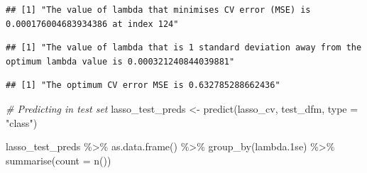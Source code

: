 \documentclass[
]{article}
\newenvironment{Shaded}{\begin{snugshade}}{\end{snugshade}}
\newcommand{\AttributeTok}[1]{\textcolor[rgb]{0.77,0.63,0.00}{#1}}
\newcommand{\CommentTok}[1]{\textcolor[rgb]{0.56,0.35,0.01}{\textit{#1}}}
\newcommand{\DecValTok}[1]{\textcolor[rgb]{0.00,0.00,0.81}{#1}}
\newcommand{\FloatTok}[1]{\textcolor[rgb]{0.00,0.00,0.81}{#1}}
\newcommand{\FunctionTok}[1]{\textcolor[rgb]{0.00,0.00,0.00}{#1}}
\newcommand{\NormalTok}[1]{#1}
\newcommand{\OtherTok}[1]{\textcolor[rgb]{0.56,0.35,0.01}{#1}}
\newcommand{\SpecialCharTok}[1]{\textcolor[rgb]{0.00,0.00,0.00}{#1}}
\newcommand{\StringTok}[1]{\textcolor[rgb]{0.31,0.60,0.02}{#1}}
\begin{document}
\begin{verbatim}
## [1] "The value of lambda that minimises CV error (MSE) is 0.000176004683934386 at index 124"
\end{verbatim}

\begin{Shaded}
\end{Shaded}

\begin{verbatim}
## [1] "The value of lambda that is 1 standard deviation away from the optimum lambda value is 0.000321240844039881"
\end{verbatim}

\begin{Shaded}
\end{Shaded}

\begin{verbatim}
## [1] "The optimum CV error MSE is 0.632785288662436"
\end{verbatim}

\begin{Shaded}
\begin{Highlighting}[]
\CommentTok{\# Predicting in test set}
\NormalTok{lasso\_test\_preds }\OtherTok{\textless{}{-}} \FunctionTok{predict}\NormalTok{(lasso\_cv, test\_dfm, }\AttributeTok{type =} \StringTok{"class"}\NormalTok{)}

\NormalTok{lasso\_test\_preds }\SpecialCharTok{\%\textgreater{}\%}
  \FunctionTok{as.data.frame}\NormalTok{() }\SpecialCharTok{\%\textgreater{}\%}
  \FunctionTok{group\_by}\NormalTok{(lambda}\FloatTok{.1}\NormalTok{se) }\SpecialCharTok{\%\textgreater{}\%}
  \FunctionTok{summarise}\NormalTok{(}\AttributeTok{count =} \FunctionTok{n}\NormalTok{())}
\end{Highlighting}
\end{Shaded}
\end{document}
